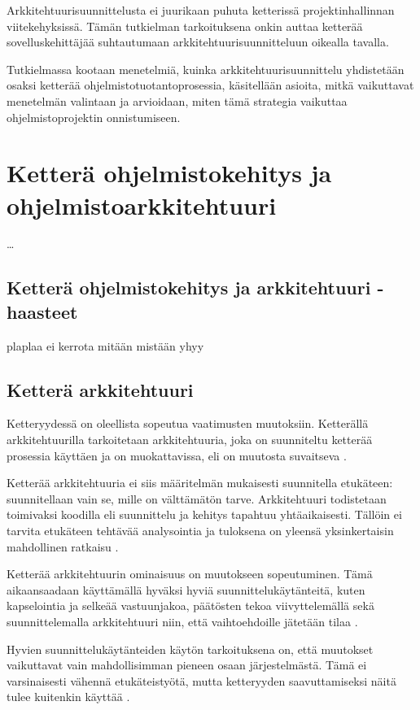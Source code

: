 Arkkitehtuurisuunnittelusta ei juurikaan puhuta ketterissä projektinhallinnan viitekehyksissä. Tämän tutkielman tarkoituksena onkin auttaa ketterää sovelluskehittäjää suhtautumaan arkkitehtuurisuunnitteluun oikealla tavalla.

Tutkielmassa kootaan menetelmiä, kuinka arkkitehtuurisuunnittelu yhdistetään osaksi ketterää ohjelmistotuotantoprosessia, käsitellään asioita, mitkä vaikuttavat menetelmän valintaan ja arvioidaan, miten tämä strategia vaikuttaa ohjelmistoprojektin onnistumiseen.

\chapter{Ketterä ohjelmistokehitys ja ohjelmistoarkkitehtuuri}

\dots

\section{Ketterä ohjelmistokehitys ja arkkitehtuuri - haasteet}

plaplaa ei kerrota mitään mistään yhyy
\section{Ketterä arkkitehtuuri}

Ketteryydessä on oleellista sopeutua vaatimusten muutoksiin. Ketterällä arkkitehtuurilla tarkoitetaan arkkitehtuuria, joka on suunniteltu ketterää prosessia käyttäen ja on muokattavissa, eli on muutosta suvaitseva \citep{waterman_how_2015}. 

Ketterää arkkitehtuuria ei siis määritelmän mukaisesti suunnitella etukäteen: suunnitellaan vain se, mille on välttämätön tarve. Arkkitehtuuri todistetaan toimivaksi koodilla eli suunnittelu ja kehitys tapahtuu yhtäaikaisesti. Tällöin ei tarvita etukäteen tehtävää analysointia ja tuloksena on yleensä yksinkertaisin mahdollinen ratkaisu \citep{waterman_agility_2018}. 

Ketterää arkkitehtuurin ominaisuus on muutokseen sopeutuminen. Tämä aikaansaadaan käyttämällä hyväksi hyviä suunnittelukäytänteitä, kuten kapselointia ja selkeää vastuunjakoa, päätösten tekoa viivyttelemällä sekä suunnittelemalla arkkitehtuuri niin, että vaihtoehdoille jätetään tilaa \citep{waterman_agility_2018}. 

Hyvien suunnittelukäytänteiden käytön tarkoituksena on, että muutokset vaikuttavat vain mahdollisimman pieneen osaan järjestelmästä. Tämä ei varsinaisesti vähennä etukäteistyötä, mutta ketteryyden saavuttamiseksi näitä tulee kuitenkin käyttää \citep{waterman_agility_2018}. 

